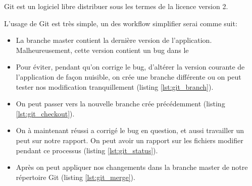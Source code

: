 Git est un logiciel libre distribuer sous les termes de la licence   version 2.

L'usage de Git est très simple, un des workflow simplifier serai comme suit:

\begin{itemize}

\item La branche master contient la dernière version de l'application. Malheureusement, cette version contient un bug dans le 

\item Pour éviter, pendant qu'on corrige le bug, d'altérer la version courante de  l'application de façon nuisible, on crée une branche différente ou on peut tester nos modification tranquillement (listing \ref{lst:git_branch}).

\item On peut passer vers la nouvelle branche crée précédemment (listing \ref{lst:git_checkout}).

\item On à maintenant réussi a corrigé le bug en question, et aussi travailler un peut sur notre rapport. On peut avoir un rapport sur les fichiers modifier pendant ce processus (listing \ref{lst:git_status}).

\item Après on peut appliquer nos changements dans la branche master de notre répertoire Git (listing \ref{lst:git_merge}).

\end{itemize}

\begin{lstlisting}[language=bash, label=lst:git_branch, caption=Git Branch]

\end{lstlisting}

\begin{lstlisting}[language=bash, label=lst:git_checkout, caption=Git checkout]

\end{lstlisting}

